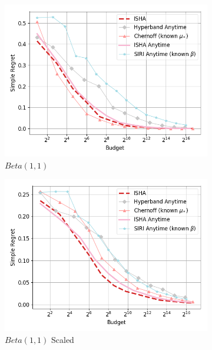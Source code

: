 \begin{figure}
\centering
\caption{Anytime Performance}
\begin{subfigure}{0.4\textwidth}
	\includegraphics[width=\textwidth]{fixedbudget/figures/folder3/alpha1_beta1_unscaled.png}
	\caption{$Beta(1,1)$}
	\label{appendix:fig:sh-anytime:alpha1_beta1_unscaled}
\end{subfigure}
\quad
\begin{subfigure}{0.4\textwidth}
	\includegraphics[width=\textwidth]{fixedbudget/figures/folder3/alpha1_beta1_scaled.png}
	\caption{$Beta(1,1)$ Scaled}
	\label{appendix:fig:sh-anytime:alpha1_beta1_scaled}
\end{subfigure}
%
\begin{subfigure}{0.4\textwidth}

\end{subfigure}
\end{figure}
